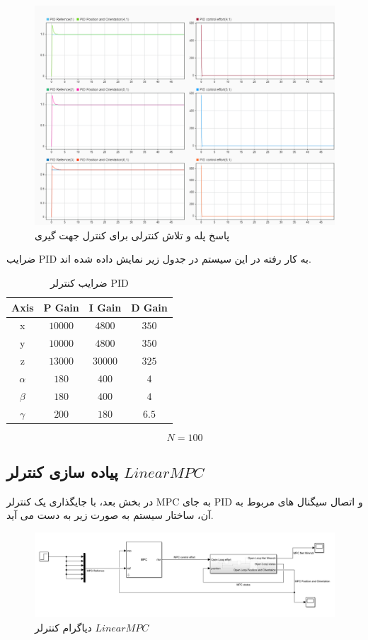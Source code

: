 \begin{figure}[H]
	\centering
	\includegraphics[width=0.7\textheight]{../img/PID_Response2_orinetation}
	\caption{پاسخ پله و تلاش کنترلی برای کنترل جهت گیری}
	\label{fig:pidresponse_orientation}
\end{figure}
ضرایب PID به کار رفته در این سیستم در جدول زیر نمایش داده شده اند.
\begin{table}[H]
	\centering
	\begin{tabular}{c|c|c|c}
		\hline
		\textbf{Axis} & \textbf{P Gain} & \textbf{I Gain} & \textbf{D Gain} \\
		\hline
		x & $10000$ & $4800$ & $350$ \\
		y & $10000$ & $4800$ & $350$ \\
		z & $13000$ & $30000$ & $325$ \\
		$\alpha$ & $180$ & $400$ & $4$ \\
		$\beta$ & $180$ & $400$ & $4$ \\
		$\gamma$ & $200$ & $180$ & $6.5$ \\
		\hline
	\end{tabular}
	\caption{ضرایب کنترلر PID}
	\label{tab:pid_gains}
\end{table}
\[
N = 100
\]

\subsection{پیاده سازی کنترلر $Linear MPC$}
در بخش بعد، با جایگذاری یک کنترلر MPC به جای PID و اتصال سیگنال های مربوط به آن، ساختار سیستم به صورت زیر به دست می آید.
\begin{figure}[H]
	\centering
	\includegraphics[width=0.9\linewidth]{../img/LMPC_diagram}
	\caption{دیاگرام کنترلر $Linear MPC$}
	\label{fig:lmpcdiagram}
\end{figure}


